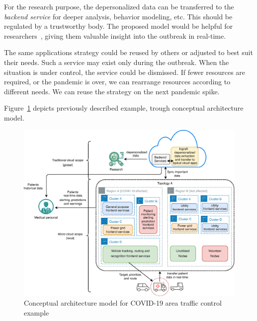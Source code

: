 For the research purpose, the depersonalized data can be transferred to the \emph{backend service} for deeper analysis, behavior modeling, etc. This should be regulated by a trustworthy body. The proposed model would be helpful for researchers~\cite{v2013a}, giving them valuable insight into the outbreak in real-time. 

The same applications strategy could be reused by others or adjusted to best suit their needs. Such a service may exist only during the outbreak. When the situation is under control, the service could be dismissed. If fewer resources are required, or the pandemic is over, we can rearrange resources according to different needs. We can reuse the strategy on the next pandemic spike.

Figure~\ref{fig:fig25} depicts previously described example, trough conceptual architecture model.

\begin{figure}[H]
	\begin{center}
		\includegraphics[width=\columnwidth]{images/Figure25}
	\end{center}
	\vspace{-0.5cm}
	\caption{Conceptual architecture model for COVID-19 area traffic control example}
	\label{fig:fig25}
\end{figure}
%
%